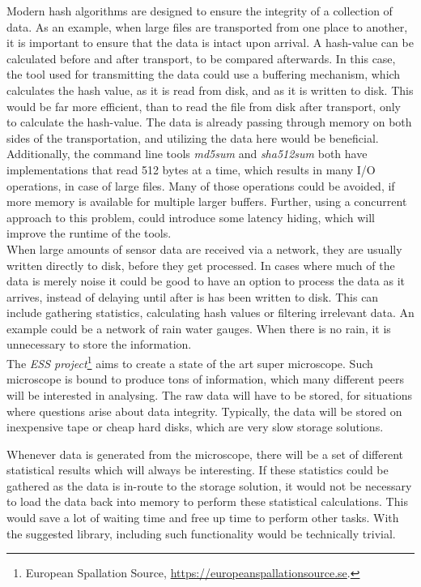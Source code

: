 \documentclass[a4paper]{article}
\begin{document}
Modern hash algorithms are designed to ensure the integrity of a collection of data. As an example, when large files are transported from one place to another, it is important to ensure that the data is intact upon arrival. A hash-value can be calculated before and after transport, to be compared afterwards. In this case, the tool used for transmitting the data could use a buffering mechanism, which calculates the hash value, as it is read from disk, and as it is written to disk. This would be far more efficient, than to read the file from disk after transport, only to calculate the hash-value. The data is already passing through memory on both sides of the transportation, and utilizing the data here would be beneficial.\\

Additionally, the command line tools \textit{md5sum} and \textit{sha512sum} both have implementations that read 512 bytes at a time, which results in many I/O operations, in case of large files. Many of those operations could be avoided, if more memory is available for multiple larger buffers. Further, using a concurrent approach to this problem, could introduce some latency hiding, which will improve the runtime of the tools.\\

When large amounts of sensor data are received via a network, they are usually written directly to disk, before they get processed. In cases where much of the data is merely noise it could be good to have an option to process the data as it arrives, instead of delaying until after is has been written to disk. This can include gathering statistics, calculating hash values or filtering irrelevant data. An example could be a network of rain water gauges. When there is no rain, it is unnecessary to store the information.\\

The \textit{ESS project}\footnote{European Spallation Source, \url{https://europeanspallationsource.se}.}  aims to create a state of the art super microscope. Such microscope is bound to produce tons of information, which many different peers will be interested in analysing. The raw data will have to be stored, for situations where questions arise about data integrity. Typically, the data will be stored on inexpensive tape or cheap hard disks, which are very slow storage solutions. 

Whenever data is generated from the microscope, there will be a set of different statistical results which will always be interesting. If these statistics could be gathered as the data is in-route to the storage solution, it would not be necessary to load the data back into memory to perform these statistical calculations. This would save a lot of waiting time and free up time to perform other tasks. With the suggested library, including such functionality would be technically trivial.
\end{document}
